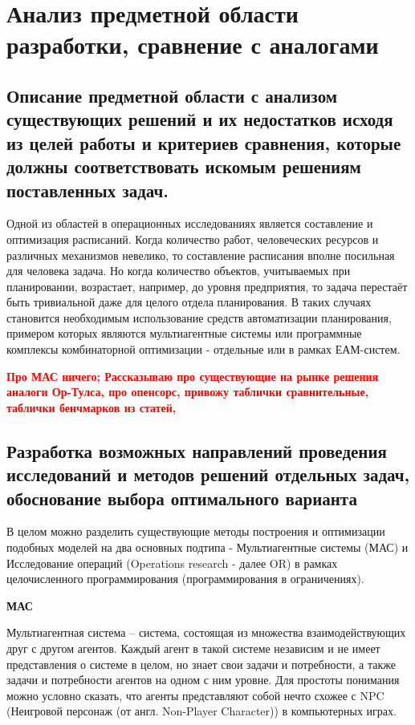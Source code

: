 \section{Анализ предметной области разработки, сравнение с аналогами}

\subsection{Описание предметной области с анализом существующих решений и их недостатков исходя из целей работы и критериев сравнения, которые должны соответствовать искомым решениям поставленных задач.}
Одной из областей в операционных исследованиях является составление и оптимизация расписаний. Когда количество работ, человеческих ресурсов и различных механизмов невелико, то составление расписания вполне посильная для человека задача. Но когда количество объектов, учитываемых при планировании, возрастает, например, до уровня предприятия, то задача перестаёт быть тривиальной даже для целого отдела планирования. В таких случаях становится необходимым использование средств автоматизации планирования, примером которых являются мультиагентные системы или программные комплексы комбинаторной оптимизации - отдельные или в рамках ЕАМ-систем.

\textcolor{red}{\textbf{Про МАС ничего; Рассказываю про существующие на рынке решения аналоги Ор-Тулса, про опенсорс, привожу таблички сравнительные, таблички бенчмарков из статей, }}



\subsection{Разработка возможных направлений проведения исследований и методов решений отдельных задач, обоснование выбора оптимального варианта}
В целом можно разделить существующие методы построения и оптимизации подобных моделей на два основных подтипа - Мультиагентные системы (МАС) и Исследование операций (Operations research - далее OR) в рамках целочисленного программирования (программирования в ограничениях).

\textbf{МАС}

Мультиагентная система – система, состоящая из множества взаимодействующих друг с другом агентов. Каждый агент в такой системе независим и не имеет представления о системе в целом, но знает свои задачи и потребности, а также задачи и потребности агентов на одном с ним уровне. Для простоты понимания можно условно сказать, что агенты представляют собой нечто схожее с NPC (Неигровой персонаж (от англ. Non-Player Character)) в компьютерных играх. 

